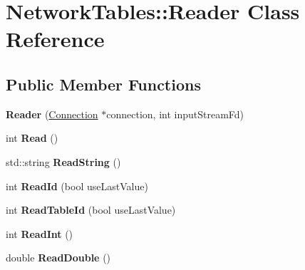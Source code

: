 \hypertarget{classNetworkTables_1_1Reader}{
\section{NetworkTables::Reader Class Reference}
\label{classNetworkTables_1_1Reader}
}
\subsection*{Public Member Functions}
\begin{DoxyCompactItemize}
\item 
\hypertarget{classNetworkTables_1_1Reader_adfa3a10fbf1916ee0cd6d53e3dcee9cc}{
{\bfseries Reader} (\hyperlink{classNetworkTables_1_1Connection}{Connection} $\ast$connection, int inputStreamFd)}
\label{classNetworkTables_1_1Reader_adfa3a10fbf1916ee0cd6d53e3dcee9cc}

\item 
\hypertarget{classNetworkTables_1_1Reader_a4f8d0e8411728d8ba3a57d266088dd49}{
int {\bfseries Read} ()}
\label{classNetworkTables_1_1Reader_a4f8d0e8411728d8ba3a57d266088dd49}

\item 
\hypertarget{classNetworkTables_1_1Reader_a2e94d2e4d909caa01a043328f082879b}{
std::string {\bfseries ReadString} ()}
\label{classNetworkTables_1_1Reader_a2e94d2e4d909caa01a043328f082879b}

\item 
\hypertarget{classNetworkTables_1_1Reader_af7ea89957c484369971bd060929c1b1c}{
int {\bfseries ReadId} (bool useLastValue)}
\label{classNetworkTables_1_1Reader_af7ea89957c484369971bd060929c1b1c}

\item 
\hypertarget{classNetworkTables_1_1Reader_a95e4dadb40f7cbce6da634bb8387f72f}{
int {\bfseries ReadTableId} (bool useLastValue)}
\label{classNetworkTables_1_1Reader_a95e4dadb40f7cbce6da634bb8387f72f}

\item 
\hypertarget{classNetworkTables_1_1Reader_a3c7a46bc6042eda33f3770cfed1e8817}{
int {\bfseries ReadInt} ()}
\label{classNetworkTables_1_1Reader_a3c7a46bc6042eda33f3770cfed1e8817}

\item 
\hypertarget{classNetworkTables_1_1Reader_a160cc682a94d5c248cbaed30f344dfeb}{
double {\bfseries ReadDouble} ()}
\label{classNetworkTables_1_1Reader_a160cc682a94d5c248cbaed30f344dfeb}


\end{DoxyCompactItemize}
